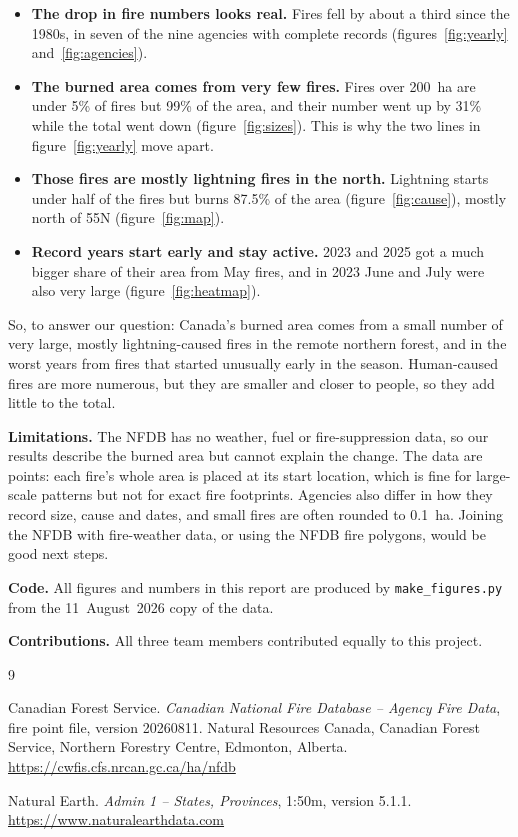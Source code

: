 \documentclass[12pt]{article}
\begin{document}
\begin{itemize}\setlength{\itemsep}{0pt}
  \item \textbf{The drop in fire numbers looks real.} Fires fell by about a
        third since the 1980s, in seven of the nine agencies with complete
        records (figures~\ref{fig:yearly} and~\ref{fig:agencies}).
  \item \textbf{The burned area comes from very few fires.} Fires over 200~ha
        are under 5\% of fires but 99\% of the area, and their number went
        up by 31\% while the total went down (figure~\ref{fig:sizes}). This
        is why the two lines in figure~\ref{fig:yearly} move apart.
  \item \textbf{Those fires are mostly lightning fires in the north.}
        Lightning starts under half of the fires but burns 87.5\% of the area
        (figure~\ref{fig:cause}), mostly north of 55\textdegree N
        (figure~\ref{fig:map}).
  \item \textbf{Record years start early and stay active.} 2023 and 2025 got
        a much bigger share of their area from May fires, and in 2023 June
        and July were also very large (figure~\ref{fig:heatmap}).
\end{itemize}

So, to answer our question: Canada's burned area comes from a small number of
very large, mostly lightning-caused fires in the remote northern forest, and
in the worst years from fires that started unusually early in the season.
Human-caused fires are more numerous, but they are smaller and closer to
people, so they add little to the total.

\textbf{Limitations.} The NFDB has no weather, fuel or fire-suppression data,
so our results describe the burned area but cannot explain the change. The
data are points: each fire's whole area is placed at its start location, which
is fine for large-scale patterns but not for exact fire footprints. Agencies
also differ in how they record size, cause and dates, and small fires are
often rounded to 0.1~ha. Joining the NFDB with fire-weather data, or using the
NFDB fire polygons, would be good next steps.

\textbf{Code.} All figures and numbers in this report are produced by
\texttt{make\_figures.py} from the 11~August~2026 copy of the data.

\textbf{Contributions.} All three team members contributed equally to this
project.

\begin{thebibliography}{9}\setlength{\itemsep}{0pt}
\small\raggedright
{}
Canadian Forest Service. \emph{Canadian National Fire Database -- Agency Fire
Data}, fire point file, version 20260811. Natural Resources Canada, Canadian
Forest Service, Northern Forestry Centre, Edmonton, Alberta.
\url{https://cwfis.cfs.nrcan.gc.ca/ha/nfdb}

Natural Earth. \emph{Admin 1 -- States, Provinces}, 1:50m, version 5.1.1.
\url{https://www.naturalearthdata.com}
\end{thebibliography}
\end{document}
